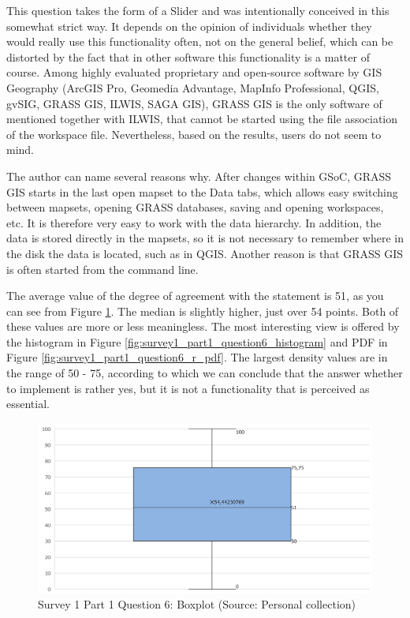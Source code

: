 \documentclass[a4paper,10pt,twoside]{article}
\begin{document}
\noindent This question takes the form of a Slider and was
intentionally conceived in this somewhat strict way. It depends on the
opinion of individuals whether they would really use this
functionality often, not on the general belief, which can be distorted
by the fact that in other software this functionality is a matter of
course. Among highly evaluated proprietary and open-source software by
GIS Geography \cite{gisgeography} (ArcGIS Pro, Geomedia Advantage,
MapInfo Professional, QGIS, gvSIG, GRASS GIS, ILWIS, SAGA GIS), 
GRASS GIS is the only software of
mentioned together with ILWIS, that cannot be started using the file
association of the workspace file. Nevertheless, based on the results,
users do not seem to mind.

The author can name several reasons why. After changes within GSoC,
GRASS GIS starts in the last open mapset to the Data tabs, which
allows easy switching between mapsets, opening GRASS databases, saving
and opening workspaces, etc. It is therefore very easy to work with
the data hierarchy. In addition, the data is stored directly in the
mapsets, so it is not necessary to remember where in the disk the data
is located, such as in QGIS. Another reason is that GRASS GIS is often
started from the command line.

The average value of the degree of agreement with the statement is 51,
as you can see from Figure
\ref{fig:survey1_part1_question6_boxplot}. The median is slightly
higher, just over 54 points. Both of these values are more or less
meaningless. The most interesting view is offered by the histogram in
Figure \ref{fig:survey1_part1_question6_histogram} and PDF in Figure
\ref{fig:survey1_part1_question6_r_pdf}. The largest density values
are in the range of 50 - 75, according to which we can conclude that
the answer whether to implement is rather yes, but it is not a
functionality that is perceived as essential.

\vspace{0.3cm}
\begin{figure}[hbt!] 
\begin{center}
\includegraphics[width=12.5cm]{../surveys/analyzed_data/survey1_part1_question6_boxplot.png} 
\caption[Survey 1 Part 1 Question 6: Boxplot]{Survey 1 Part 1 Question 6: Boxplot (Source: Personal collection)}
\label{fig:survey1_part1_question6_boxplot}
\end{center}
\end{figure}
\end{document}
